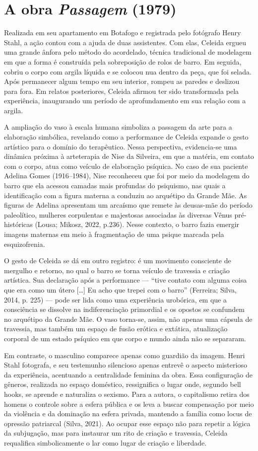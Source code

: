 \section*{A obra \emph{Passagem} (1979)}
Realizada em seu apartamento em Botafogo e registrada pelo fotógrafo Henry Stahl, a ação contou com a ajuda de duas assistentes. Com elas, Celeida ergueu uma grande ânfora pelo método do acordelado, técnica tradicional de modelagem em que a forma é construída pela sobreposição de rolos de barro. Em seguida, cobriu o corpo com argila líquida e se colocou nua dentro da peça, que foi selada. Após permanecer algum tempo em seu interior, rompeu as paredes e deslizou para fora. Em relatos posteriores, Celeida afirmou ter sido transformada pela experiência, inaugurando um período de aprofundamento em sua relação com a argila.

A ampliação do vaso à escala humana simboliza a passagem da arte para a elaboração simbólica, revelando como a performance de Celeida expande o gesto artístico para o domínio do terapêutico. Nessa perspectiva, evidencia-se uma dinâmica próxima à arteterapia de Nise da Silveira, em que a matéria, em contato com o corpo, atua como veículo de elaboração psíquica. No caso de sua paciente Adelina Gomes (1916–1984), Nise reconheceu que foi por meio da modelagem do barro que ela acessou camadas mais profundas do psiquismo, nas quais a identificação com a figura materna a conduziu ao arquétipo da Grande Mãe. As figuras de Adelina apresentam um arcaísmo que remete às deusas-mãe do período paleolítico, mulheres corpulentas e majestosas associadas às diversas Vênus pré-históricas (Lousa; Mikosz, 2022, p.236). Nesse contexto, o barro fazia emergir imagens maternas em meio à fragmentação de uma psique marcada pela esquizofrenia.

O gesto de Celeida se dá em outro registro: é um movimento consciente de mergulho e retorno, no qual o barro se torna veículo de travessia e criação artística. Sua declaração após a performance — “tive contato com alguma coisa que era como um útero […] Eu acho que trepei com o barro” (Ferreira; Silva, 2014, p. 225) — pode ser lida como uma experiência urobórica, em que a consciência se dissolve na indiferenciação primordial e os opostos se confundem no arquétipo da Grande Mãe. O vaso torna-se, assim, não apenas uma cápsula de travessia, mas também um espaço de fusão erótica e extática, atualização corporal de um estado psíquico em que corpo e mundo ainda não se separaram.

Em contraste, o masculino comparece apenas como guardião da imagem. Henri Stahl fotografa, e seu testemunho silencioso apenas entrevê o aspecto misterioso da experiência, acentuando a centralidade feminina da obra. Essa configuração de gêneros, realizada no espaço doméstico, ressignifica o lugar onde, segundo bell hooks, se aprende e naturaliza o sexismo. Para a autora, o capitalismo retira dos homens o controle sobre a esfera pública e os leva a buscar compensação por meio da violência e da dominação na esfera privada, mantendo a família como locus de opressão patriarcal (Silva, 2021). Ao ocupar esse espaço não para repetir a lógica da subjugação, mas para instaurar um rito de criação e travessia, Celeida requalifica simbolicamente o lar como lugar de criação e liberdade.


